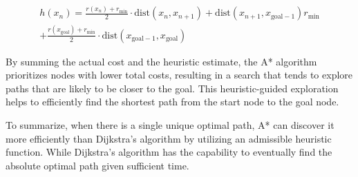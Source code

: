 \documentclass[12pt]{report}
\begin{document}
        \begin{equation}
        \begin{aligned}
        h(x_n) = \frac{r(x_n) + r_{\text{min}}}{2} \cdot \text{dist}(x_n, x_{n+1}) + \text{dist}(x_{n+1}, x_{\text{goal}-1}) r_{\text{min}} \\
        + \frac{r(x_{\text{goal}}) + r_{\text{min}}}{2} \cdot \text{dist}(x_{\text{goal}-1}, x_{\text{goal}})
        \end{aligned}
        \end{equation}

        By summing the actual cost and the heuristic estimate, the A* algorithm prioritizes nodes with lower total
        costs, resulting in a search that tends to explore paths that are likely to be closer to the goal. This
        heuristic-guided exploration helps to efficiently find the shortest path from the start node to the goal node.

        To summarize, when there is a single unique optimal path, A* can discover it more efficiently than Dijkstra's
        algorithm by utilizing an admissible heuristic function. While Dijkstra's algorithm has the capability to
        eventually find the absolute optimal path given sufficient time. 
\end{document}
